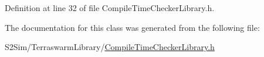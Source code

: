 Definition at line 32 of file Compile\-Time\-Checker\-Library.\-h.



The documentation for this class was generated from the following file\-:\begin{DoxyCompactItemize}
\item 
S2\-Sim/\-Terraswarm\-Library/\hyperlink{_compile_time_checker_library_8h}{Compile\-Time\-Checker\-Library.\-h}\end{DoxyCompactItemize}
